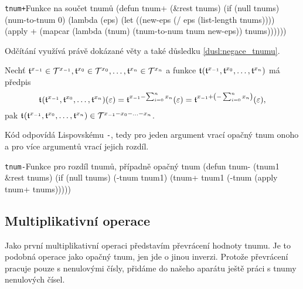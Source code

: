 \begin{lispcode}{\texttt{tnum+}}{Funkce na součet tnumů}
(\textcolor{funkcionalni}{defun} \textcolor{pojmenovan}{tnum+} (&rest tnums)
  (\textcolor{funkcionalni}{if} (\textcolor{funkcionalni}{null} tnums)
      (\textcolor{moje}{num-to-tnum} 0)
    (\textcolor{funkcionalni}{lambda} (eps)
      (\textcolor{vedlejsi}{let} ((new-eps (\textcolor{matematicke}{/} eps (\textcolor{funkcionalni}{list-length} tnums))))
        (\textcolor{funkcionalni}{apply} \textquotesingle\textcolor{moje}{+} 
               (\textcolor{funkcionalni}{mapcar} (\textcolor{funkcionalni}{lambda} (tnum) 
                         (\textcolor{moje}{tnum-to-num} tnum new-eps))
                       tnums))))))
\end{lispcode}

Odčítání využívá právě dokázané věty a také důsledku \ref{dusl:negace_tnumu}.
\begin{fact}
Nechť $\mathfrak{t}^{x_{-1}}\in\mathcal{T}^{x_{-1}}, \mathfrak{t}^{x_{0}}\in\mathcal{T}^{x_{0}}, \ldots, \mathfrak{t}^{x_{n}}\in\mathcal{T}^{x_{n}}$ a funkce $\mathfrak{t}^{}(\mathfrak{t}^{x_{-1}},\mathfrak{t}^{x_0},\ldots,\mathfrak{t}^{x_n})$ má předpis
\begin{equation}
\mathfrak{t}^{}(\mathfrak{t}^{x_{-1}},\mathfrak{t}^{x_0},\ldots,\mathfrak{t}^{x_n})(\varepsilon)=\mathfrak{t}^{x_{-1}-\sum_{i=0}^nx_n}(\varepsilon)=\mathfrak{t}^{x_{-1}+\left(-\sum_{i=0}^nx_n\right)}(\varepsilon),
\end{equation}
pak $\mathfrak{t}^{}(\mathfrak{t}^{x_{-1}},\mathfrak{t}^{x_0},\ldots,\mathfrak{t}^{x_n})\in\mathcal{T}^{x_{-1}-x_0-\ldots -x_n}$.
\end{fact}

Kód odpovídá Lispovskému \texttt{-}, tedy pro jeden argument vrací opačný tnum onoho a pro více argumentů vrací jejich rozdíl.

\begin{lispcode}{\texttt{tnum-}}{Funkce pro rozdíl tnumů, případně opačný tnum}
(\textcolor{funkcionalni}{defun} \textcolor{pojmenovan}{tnum-} (tnum1 &rest tnums)
  (\textcolor{funkcionalni}{if} (\textcolor{funkcionalni}{null} tnums)
      (\textcolor{moje}{-tnum} tnum1)
    (\textcolor{moje}{tnum+} tnum1 (\textcolor{moje}{-tnum} (\textcolor{funkcionalni}{apply} \textquotesingle\textcolor{moje}{tnum+} tnums)))))
\end{lispcode}

\subsection{Multiplikativní operace}
Jako první multiplikativní operaci představím převrácení hodnoty tnumu. Je to podobná operace jako opačný tnum, jen jde o jinou inverzi. Protože převrácení pracuje pouze s nenulovými čísly, přidáme do našeho aparátu ještě práci s tnumy nenulových čísel.

